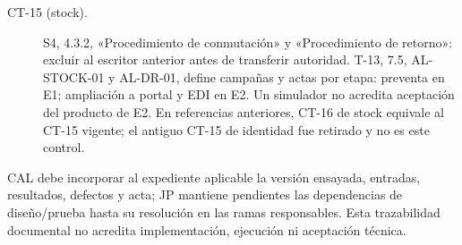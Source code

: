 \begin{description}
\item[CT-15 (stock).] S4, 4.3.2, «Procedimiento de conmutación» y «Procedimiento de retorno»: excluir al escritor anterior antes de transferir autoridad. T-13, 7.5, AL-STOCK-01 y AL-DR-01, define campañas y actas por etapa: preventa en E1; ampliación a portal y EDI en E2. Un simulador no acredita aceptación del producto de E2. En referencias anteriores, CT-16 de stock equivale al CT-15 vigente; el antiguo CT-15 de identidad fue retirado y no es este control.
\end{description}

CAL debe incorporar al expediente aplicable la versión ensayada, entradas, resultados, defectos y acta; JP mantiene pendientes las dependencias de diseño/prueba hasta su resolución en las ramas responsables. Esta trazabilidad documental no acredita implementación, ejecución ni aceptación técnica.
